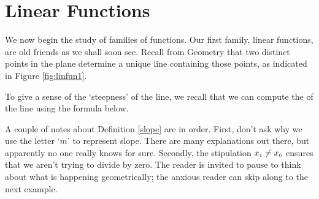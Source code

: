 \section{Linear Functions}

\label{LinearFunctions}

We now begin the study of families of functions.  Our first family, linear functions, are old friends as we shall soon see.  Recall from Geometry that two distinct points in the plane determine a unique line containing those points, as indicated in Figure \ref{fig:linfun1}.


To give a sense of the `steepness' of the line, we recall that we can compute the  of the line using the formula below.

\smallskip





\smallskip

A couple of notes about Definition \ref{slope} are in order.  First, don't ask why we use the letter `$m$' to represent slope.  There are many explanations out there, but apparently no one really knows for sure. Secondly, the stipulation  $x_{\mbox{\tiny$1$}} \neq x_{\mbox{\tiny$0$}}$ ensures that we aren't trying to divide by zero.  The reader is invited to pause to think about what is happening geometrically; the anxious reader can skip along to the next example.


